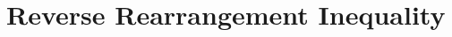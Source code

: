 \documentclass[inequalities.tex]{subfile}
\begin{document}
	\chapter{Reverse Rearrangement Inequality}\label{ch:reverse}
\end{document}
